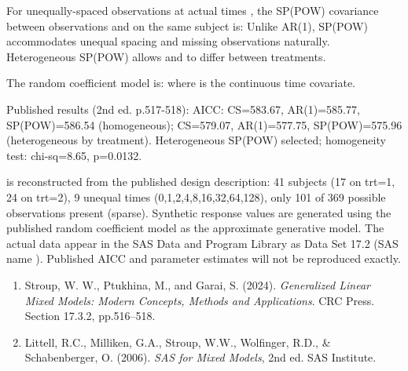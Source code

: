 \documentclass[a4paper]{book}
\begin{document}
%
\begin{Details}
For unequally-spaced observations at actual times , the SP(POW) covariance between
observations  and  on the same subject is:
Unlike AR(1), SP(POW) accommodates unequal spacing and missing observations
naturally.  Heterogeneous SP(POW) allows  and \eqn{\rho}{} to
differ between treatments.

The random coefficient model is:
where  is the continuous time covariate.

Published results (2nd ed. p.517-518):
AICC: CS=583.67, AR(1)=585.77, SP(POW)=586.54 (homogeneous);
CS=579.07, AR(1)=577.75, SP(POW)=575.96 (heterogeneous by treatment).
Heterogeneous SP(POW) selected; homogeneity test: chi-sq=8.65, p=0.0132.
\end{Details}
%
\begin{Note}
  is reconstructed from the
published design description: 41 subjects (17 on trt=1, 24 on trt=2),
9 unequal times (0,1,2,4,8,16,32,64,128), only 101 of 369 possible
observations present (sparse).  Synthetic response values are generated
using the published random coefficient model as the approximate generative
model.  The actual data appear in the SAS Data and Program Library as
Data Set 17.2 (SAS name ).  Published AICC and parameter
estimates will not be reproduced exactly.
\end{Note}
%
\begin{References}
\begin{enumerate}

\item{} Stroup, W. W., Ptukhina, M., and Garai, S. (2024).
\emph{Generalized Linear Mixed Models: Modern Concepts, Methods and
Applications}. CRC Press. Section 17.3.2, pp.516–518.
\item{} Littell, R.C., Milliken, G.A., Stroup, W.W., Wolfinger, R.D.,
\& Schabenberger, O. (2006). \emph{SAS for Mixed Models}, 2nd ed.
SAS Institute.

\end{enumerate}

\end{References}
%
\begin{SeeAlso}
\end{SeeAlso}
\end{document}
